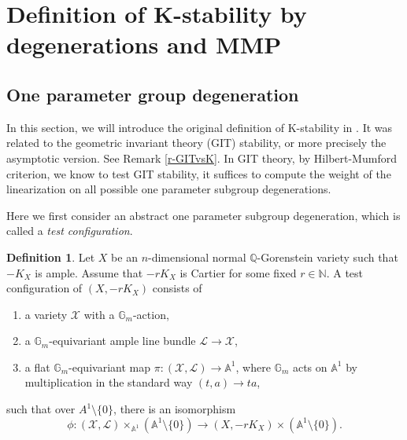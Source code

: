 \documentclass[12pt,reqno]{amsart}%
\newcommand{\cX}{{\mathcal{X}}}
\newcommand{\cL}{{\mathcal{L}}}
\theoremstyle{definition}
\newtheorem{defn}[thm]{Definition}
\newtheorem{rem}[thm]{Remark}
\theoremstyle{remark}
\begin{document}
\section{Definition of K-stability by degenerations and MMP}\label{s-degeneration}

\subsection{One parameter group degeneration}\label{ss-definition}

In this section, we will introduce the original definition of K-stability in \cite{Tia97, Don02}. It was related to the geometric invariant theory (GIT) stability, or more precisely the asymptotic version. See Remark \ref{r-GITvsK}. In GIT theory, by Hilbert-Mumford criterion, we know to test GIT stability, it suffices to compute the weight of the linearization on all possible one parameter subgroup degenerations. 

Here we first consider an abstract  one parameter subgroup degeneration, which is called a {\it test configuration}.
\begin{defn}
Let $X$ be an $n$-dimensional normal $\mathbb{Q}$-Gorenstein variety such that $-K_X$ is ample. Assume that $-rK_X$ is
Cartier for some fixed $r\in \mathbb{N}$. A test configuration of $(X, -rK_X)$ consists of
\begin{enumerate}
\item[ $\cdot$]
a variety $\cX$ with a $\mathbb{G}_m$-action,
\item[ $\cdot$]
a $\mathbb{G}_m$-equivariant ample line bundle $\cL\rightarrow
\cX$,
\item[ $\cdot$]
a flat $\mathbb{G}_m$-equivariant map $\pi: (\cX,
\mathcal{L})\rightarrow \mathbb{A}^1$, where $\mathbb{G}_m$
acts on $\mathbb{A}^1$ by multiplication in the standard way
$(t,a)\to ta$,
\end{enumerate}
such that over $A^{1}\setminus\{0\}$, there is an isomorphism 
$$\phi\colon (\cX, \cL)\times_{\mathbb{A}^1} (\mathbb{A}^1\setminus\{0\})\to (X, -rK_X)\times (\mathbb{A}^1\setminus\{0\}).$$
\end{defn}

\end{document}
